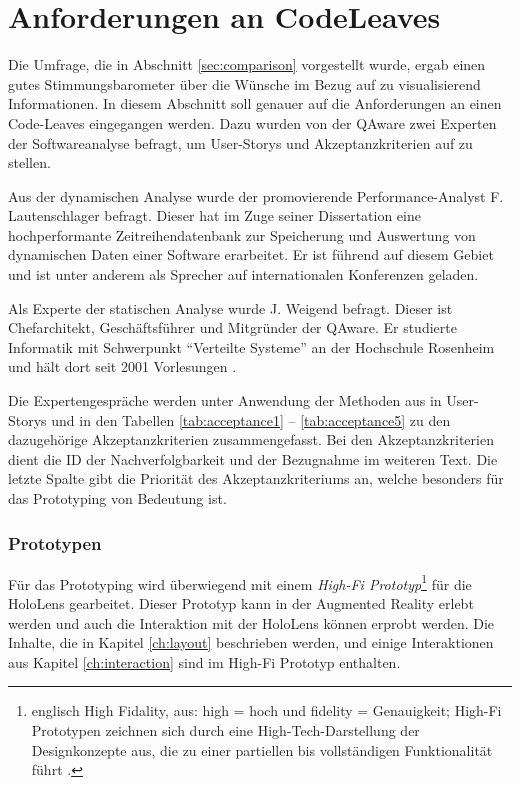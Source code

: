 \section{Anforderungen an CodeLeaves}
\label{sec:requirements}

Die Umfrage, die in Abschnitt \ref{sec:comparison} vorgestellt wurde, ergab einen gutes Stimmungsbarometer über die Wünsche im Bezug auf zu visualisierend Informationen. In diesem Abschnitt soll genauer auf die Anforderungen an einen Code-Leaves eingegangen werden. Dazu wurden von der QAware zwei Experten der Softwareanalyse befragt, um User-Storys und Akzeptanzkriterien auf zu stellen.

Aus der dynamischen Analyse wurde der promovierende Performance-Analyst F. Lautenschlager befragt. Dieser hat im Zuge seiner Dissertation eine hochperformante Zeitreihendatenbank zur Speicherung und Auswertung von dynamischen Daten einer Software erarbeitet. Er ist führend auf diesem Gebiet und ist unter anderem als Sprecher auf internationalen Konferenzen geladen.

Als Experte der statischen Analyse wurde J. Weigend befragt. Dieser ist Chefarchitekt, Geschäftsführer und Mitgründer der QAware. Er studierte Informatik mit Schwerpunkt "`Verteilte Systeme"' an der Hochschule Rosenheim und hält dort seit 2001 Vorlesungen \cite{qaware2017johannes}.

Die Expertengespräche werden unter Anwendung der Methoden aus \cite{cohn2004user} in User-Storys und in den Tabellen \ref{tab:acceptance1} -- \ref{tab:acceptance5} zu den dazugehörige Akzeptanzkriterien zusammengefasst. Bei den Akzeptanzkriterien dient die ID der Nachverfolgbarkeit und der Bezugnahme im weiteren Text. Die letzte Spalte gibt die Priorität des Akzeptanzkriteriums an, welche besonders für das Prototyping von Bedeutung ist.

\subsubsection*{Prototypen}

Für das Prototyping wird überwiegend mit einem \textit{High-Fi Prototyp}\footnote{englisch High Fidality, aus: high = hoch und fidelity = Genauigkeit; High-Fi Prototypen zeichnen sich durch eine High-Tech-Darstellung der Designkonzepte aus, die zu einer partiellen bis vollständigen Funktionalität führt \cite{egger2000fi}.} für die HoloLens gearbeitet. Dieser Prototyp kann in der Augmented Reality erlebt werden und auch die Interaktion mit der HoloLens können erprobt werden. Die Inhalte, die in Kapitel \ref{ch:layout} beschrieben werden, und einige Interaktionen aus Kapitel \ref{ch:interaction} sind im High-Fi Prototyp enthalten.

